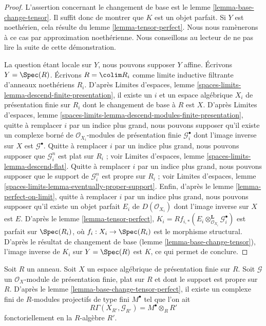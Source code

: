 \begin{proof}
L'assertion concernant le changement de base est le
lemme \ref{lemma-base-change-tensor}.
Il suffit donc de montrer que $K$ est un objet parfait. Si $Y$ est
noethérien, cela résulte du
lemme \ref{lemma-tensor-perfect}.
Nous nous ramènerons à ce cas par approximation noethérienne.
Nous conseillons au lecteur de ne pas lire la suite de cette démonstration.

\medskip\noindent
La question étant locale sur $Y$, nous pouvons supposer $Y$ affine.
Écrivons $Y = \Spec(R)$. Écrivons $R = \colim R_i$ comme limite inductive
filtrante d'anneaux noethériens $R_i$. D'après Limites d'espaces, lemme
\ref{spaces-limits-lemma-descend-finite-presentation},
il existe un $i$ et un espace algébrique $X_i$ de présentation finie
sur $R_i$ dont le changement de base à $R$ est $X$. D'après
Limites d'espaces, lemme
\ref{spaces-limits-lemma-descend-modules-finite-presentation},
quitte à remplacer $i$ par un indice plus grand, nous pouvons supposer
qu'il existe un complexe borné de
$\mathcal{O}_{X_i}$-modules de présentation finie $\mathcal{G}_i^\bullet$ dont
l'image inverse sur $X$ est $\mathcal{G}^\bullet$. Quitte à remplacer $i$
par un indice plus grand,
nous pouvons supposer que $\mathcal{G}_i^n$ est plat sur $R_i$ ; voir
Limites d'espaces, lemme
\ref{spaces-limits-lemma-descend-flat}.
Quitte à remplacer $i$ par un indice plus grand, nous pouvons supposer que
le support de $\mathcal{G}_i^n$ est propre sur $R_i$ ; voir
Limites d'espaces, lemme \ref{spaces-limits-lemma-eventually-proper-support}.
Enfin, d'après le lemme \ref{lemma-perfect-on-limit},
quitte à remplacer $i$ par un indice plus grand, nous pouvons supposer
qu'il existe un objet parfait $E_i$ de $D(\mathcal{O}_{X_i})$ dont l'image
inverse sur $X$ est $E$. D'après le lemme \ref{lemma-tensor-perfect},
$K_i =
Rf_{i, *}(E_i \otimes_{\mathcal{O}_{X_i}}^\mathbf{L} \mathcal{G}_i^\bullet)$
est parfait sur $\Spec(R_i)$, où $f_i : X_i \to \Spec(R_i)$ est
le morphisme structural. D'après le résultat de changement de base
(lemme \ref{lemma-base-change-tensor}), l'image inverse de $K_i$
sur $Y = \Spec(R)$ est $K$, ce qui permet de conclure.
\end{proof}

\begin{remark}
\label{remark-explain-perfect-direct-image}
Soit $R$ un anneau. Soit $X$ un espace algébrique de présentation finie sur
$R$. Soit $\mathcal{G}$ un $\mathcal{O}_X$-module de présentation finie,
plat sur $R$ et dont le support est propre sur $R$. D'après le
lemme \ref{lemma-base-change-tensor-perfect},
il existe un complexe fini de $R$-modules projectifs de type fini
$M^\bullet$ tel que l'on ait
$$
R\Gamma(X_{R'}, \mathcal{G}_{R'}) = M^\bullet \otimes_R R'
$$
fonctoriellement en la $R$-algèbre $R'$.
\end{remark}

